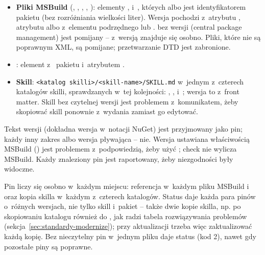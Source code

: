 \begin{itemize}
  \item \textbf{Pliki MSBuild} (, , ,
        , ): elementy ,
         i~, których
         albo  jest identyfikatorem pakietu (bez
        rozróżniania wielkości liter). Wersja pochodzi z~atrybutu ,
        atrybutu  albo z~elementu podrzędnego 
        lub .  bez wersji (central
        package management) jest pomijany --  z~wersją znajduje się
        osobno. Pliki, które nie są poprawnym XML, są pomijane; przetwarzanie DTD jest
        zabronione.
  \item \textbf{}: element  z~
        pakietu i~atrybutem .
  \item \textbf{Skill}: \texttt{<katalog skilli>/<skill-name>/SKILL.md} w~jednym z~czterech
        katalogów skilli, sprawdzanych w~tej kolejności: ,
        ,  i~; wersja
        to  z~front matter. Skill bez czytelnej wersji jest
        problemem z~komunikatem, żeby skopiować skill ponownie z~wydania zamiast go edytować.
\end{itemize}

Tekst wersji \repopath{[1.2.3]} (dokładna wersja w~notacji NuGet) jest przyjmowany jako pin;
każdy inny zakres albo wersja pływająca -- nie. Wersja ustawiana właściwością MSBuild
() jest problemem z~podpowiedzią, żeby użyć ;
check nie wylicza MSBuild. Każdy znaleziony pin jest raportowany, żeby niezgodności były
widoczne.

Pin liczy się osobno w~każdym miejscu: referencja w~każdym pliku MSBuild
i~ oraz kopia skilla w~każdym z~czterech katalogów. Status
 daje każda para pinów o~różnych wersjach, nie tylko skill i~pakiet --
także dwie kopie skilla, np. po skopiowaniu katalogu również do
, jak radzi tabela rozwiązywania problemów
(sekcja~\ref{sec:standardy-modernize}); przy aktualizacji trzeba więc zaktualizować każdą
kopię. Bez  nieczytelny pin w~jednym pliku daje status
 (kod 2), nawet gdy pozostałe piny są poprawne.

